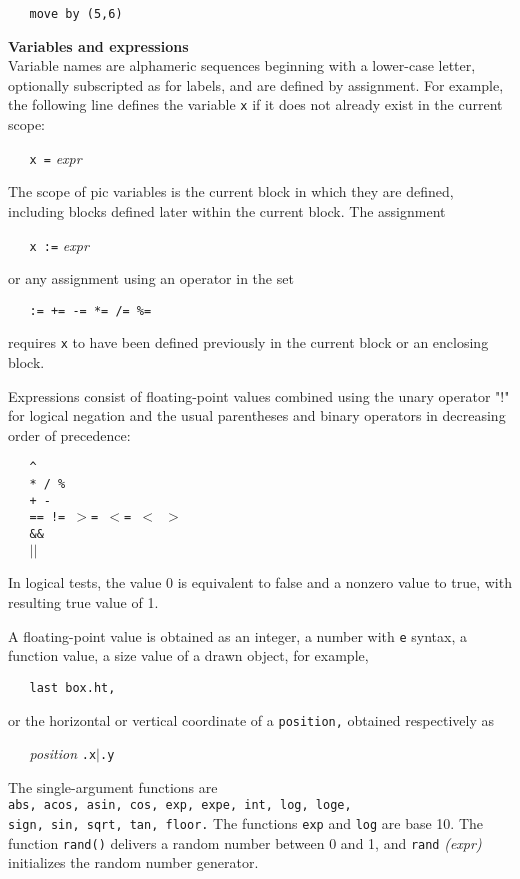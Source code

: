 {\tt \ \ \ move\ by\ (5,6)}
\par\hskip-2pc{\bf Variables and expressions}\\
Variable names are alphameric sequences beginning with a lower-case
letter, optionally subscripted as for labels, and are defined by
assignment.
For example, the following line defines the variable
{\tt x}
if it does not already exist in the current scope:

{\tt \ \ \ x\ =}
{\it expr}

The scope of
pic
variables is the current block in which they are defined, including blocks
defined later within the current block.
The assignment

{\tt \ \ \ x\ :=}
{\it expr}

or any assignment using an operator in the set

{\tt \ \ \ :=\ +=\ -=\ *=\ /=\ \%=}

requires
{\tt x}
to have been defined previously in the current block or an enclosing block.

Expressions consist of floating-point values combined using the unary
operator "!" for logical negation and the usual parentheses and binary
operators in decreasing order of precedence:

{\tt \ \ \ \^{}}
\\\hbox{}\hskip-1pt
{\tt \ \ \ *\ /\ \%}
\\\hbox{}\hskip-1pt
{\tt \ \ \ +\ -}
\\\hbox{}\hskip-1pt
{\tt \ \ \ ==\ !=\ $>$=\ $<$=\ $<$\ $>$}
\\\hbox{}\hskip-1pt
{\tt \ \ \ \&\&}
\\\hbox{}\hskip-1pt
{\tt \ \ \ $|$$|$}

In logical tests, the value 0 is equivalent to false and a nonzero value
to true, with resulting true value of 1.

A floating-point value is obtained as
an integer, a number with
{\tt e}
syntax, a function value, a size value of a drawn object, for example,

{\tt \ \ \ last\ box.ht,}

or the horizontal or vertical coordinate of a
{\tt position,}
obtained respectively as

{\it \ \ \ position}
{\tt .x$|$.y}

The single-argument functions are
{\tt abs,\ acos,\ asin,\ cos,\ exp,\ expe,\ int,\ log,\ loge,}
{\tt sign,\ sin,\ sqrt,\ tan,\ floor.}
The functions
{\tt exp}
and
{\tt log}
are base 10.
The function
{\tt rand()}
delivers a random number between 0 and 1, and
{\tt rand}
{\it (expr)}
initializes the random number generator.

